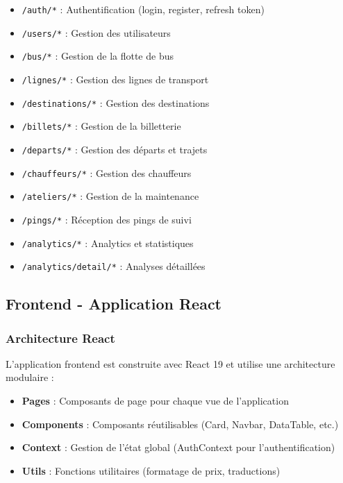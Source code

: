 \documentclass[a4paper, 12pt]{book}
\begin{document}
\begin{itemize}
    \item \texttt{/auth/*} : Authentification (login, register, refresh token)
    \item \texttt{/users/*} : Gestion des utilisateurs
    \item \texttt{/bus/*} : Gestion de la flotte de bus
    \item \texttt{/lignes/*} : Gestion des lignes de transport
    \item \texttt{/destinations/*} : Gestion des destinations
    \item \texttt{/billets/*} : Gestion de la billetterie
    \item \texttt{/departs/*} : Gestion des départs et trajets
    \item \texttt{/chauffeurs/*} : Gestion des chauffeurs
    \item \texttt{/ateliers/*} : Gestion de la maintenance
    \item \texttt{/pings/*} : Réception des pings de suivi
    \item \texttt{/analytics/*} : Analytics et statistiques
    \item \texttt{/analytics/detail/*} : Analyses détaillées
\end{itemize}

\subsection{Frontend - Application React}

\subsubsection{Architecture React}

L'application frontend est construite avec React 19 et utilise une architecture modulaire :

\begin{itemize}
    \item \textbf{Pages} : Composants de page pour chaque vue de l'application
    \item \textbf{Components} : Composants réutilisables (Card, Navbar, DataTable, etc.)
    \item \textbf{Context} : Gestion de l'état global (AuthContext pour l'authentification)
    \item \textbf{Utils} : Fonctions utilitaires (formatage de prix, traductions)
\end{itemize}
\end{document}
